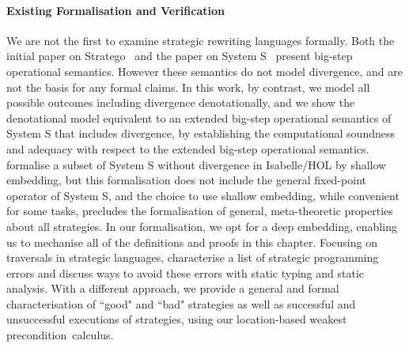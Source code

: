 \paragraph*{Existing Formalisation and Verification}
We are not the first to examine strategic rewriting languages formally. Both the initial paper on Stratego~\citep{DBLP:conf/icfp/VisserBT98} and the paper on System S~\citep{VISSER1998422} present big-step operational semantics. However these semantics do not model divergence, and are not the basis for any formal claims. In this work, by contrast, we model all possible outcomes including divergence denotationally, and we show the denotational model equivalent to an extended big-step operational semantics of System S that includes divergence, by establishing the computational soundness and adequacy with respect to the extended big-step operational semantics. \citet{DBLP:conf/ppdp/KaiserL09} formalise a subset of System S without divergence in Isabelle/HOL by shallow embedding, but this formalisation does not include the general fixed-point operator of System S, and the choice to use shallow embedding, while convenient for some tasks, precludes the formalisation of general, meta-theoretic properties about all strategies. In our formalisation, we opt for a deep embedding, enabling us to mechanise all of the definitions and proofs in this chapter. Focusing on traversals in strategic languages, \citet{lammel2013programming} characterise a list of strategic programming errors and discuss ways to avoid these errors with static typing and static analysis. With a different approach, we provide a general and formal characterisation of ``good" and ``bad" strategies as well as successful and unsuccessful executions of strategies, using our location-based weakest precondition~calculus.


